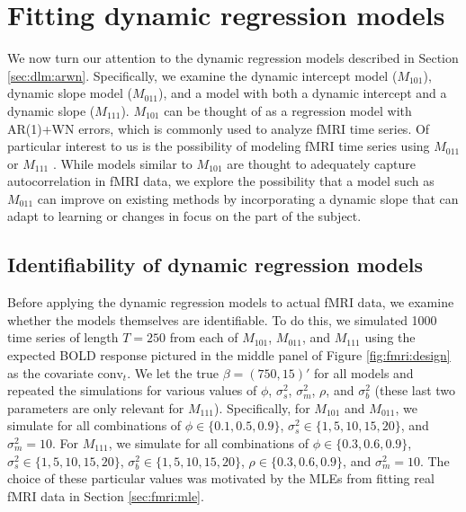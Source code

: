 \section{Fitting dynamic regression models \label{sec:fmri:dr}}

We now turn our attention to the dynamic regression models described in Section \ref{sec:dlm:arwn}. Specifically, we examine the dynamic intercept model ($M_{101}$), dynamic slope model ($M_{011}$), and a model with both a dynamic intercept and a dynamic slope ($M_{111}$). $M_{101}$ can be thought of as a regression model with AR(1)+WN errors, which is commonly used to analyze fMRI time series. Of particular interest to us is the possibility of modeling fMRI time series using $M_{011}$ or $M_{111}$ . While models similar to $M_{101}$ are thought to adequately capture autocorrelation in fMRI data, we explore the possibility that a model such as $M_{011}$ can improve on existing methods by incorporating a dynamic slope that can adapt to learning or changes in focus on the part of the subject.

\subsection{Identifiability of dynamic regression models \label{sec:fmri:id}}

Before applying the dynamic regression models to actual fMRI data, we examine whether the models themselves are identifiable. To do this, we simulated 1000 time series of length $T = 250$ from each of $M_{101}$, $M_{011}$, and $M_{111}$ using the expected BOLD response pictured in the middle panel of Figure \ref{fig:fmri:design} as the covariate $\mbox{conv}_t$. We let the true $\beta = (750, 15)'$ for all models and repeated the simulations for various values of $\phi$, $\sigma^2_s$, $\sigma^2_m$, $\rho$, and $\sigma^2_b$ (these last two parameters are only relevant for $M_{111}$). Specifically, for $M_{101}$ and $M_{011}$, we simulate for all combinations of $\phi \in \{0.1, 0.5, 0.9\}$, $\sigma^2_s \in \{1, 5, 10, 15, 20\}$, and $\sigma^2_m = 10$. For $M_{111}$, we simulate for all combinations of $\phi \in \{0.3, 0.6, 0.9\}$, $\sigma^2_s \in \{1, 5, 10, 15, 20\}$, $\sigma^2_b \in \{1, 5, 10, 15, 20\}$, $\rho \in \{0.3, 0.6, 0.9\}$, and $\sigma^2_m = 10$. The choice of these particular values was motivated by the MLEs from fitting real fMRI data in Section \ref{sec:fmri:mle}.

